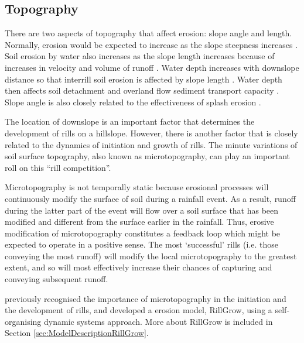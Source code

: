 \subsection{Topography}
\label{sec:Topography}

There are two aspects of topography that affect erosion: slope angle and length.
Normally, erosion would be expected to increase as the slope steepness increases
\citep{liu1994-1835}. Soil erosion by water also increases as the slope length
increases because of increases in velocity and volume of runoff
\citep{liu2000-1759}. Water depth increases with downslope distance so that
interrill soil erosion is affected by slope length \citep{gilley1985-154}.
Water depth then affects soil detachment and overland flow sediment transport
capacity \citep{gilley1985-147}. Slope angle is also closely related to the
effectiveness of splash erosion \citep{kinnell2000-discourse,vandijk2003-153}.

The location of downslope is an important factor that determines the
development of rills on a hillslope. However, there is another factor that is
closely related to the dynamics of initiation and growth of rills. The
minute variations of soil surface topography, also known as microtopography, can
play an important roll on this ``rill competition''.

Microtopography is not temporally static because erosional processes will
continuously modify the surface of soil during a rainfall event. As a
result, runoff during the latter part of the event will flow over a soil
surface that has been modified and different from the surface earlier in the
rainfall. Thus, erosive modification of microtopography constitutes a feedback
loop which might be expected to operate in a positive sense. The most
`successful' rills (i.e. those conveying the most runoff) will modify the local
microtopography to the greatest extent, and so will most effectively increase
their chances of capturing and conveying subsequent runoff.

\citet{favis-mortlock2000-2173} previously recognised the importance of
microtopography
in the initiation and the development of rills, and developed a erosion model,
RillGrow, using a self-organising dynamic systems approach. More about RillGrow
is included in Section \ref{sec:ModelDescriptionRillGrow}.

